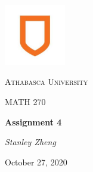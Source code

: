 \documentclass[11pt, letterpaper, twoside]{article}
\begin{document}
\begin{titlepage}
\centering
\vspace*{60px}
\hspace{0pt}
\includegraphics[width=0.2\textwidth]{logo}\par\vspace{1cm}
{\scshape\LARGE Athabasca University \par}
\vspace{1cm}
{\scshape\Large MATH 270\par}
\vspace{1.5cm}
{\huge\bfseries Assignment 4\par}
\vspace{2cm}
{\Large\itshape Stanley Zheng\par}
\vfill
{\large October 27, 2020\par}
\vspace*{50px}
\hspace{0pt}
\pagebreak
\end{titlepage}
\end{document}

